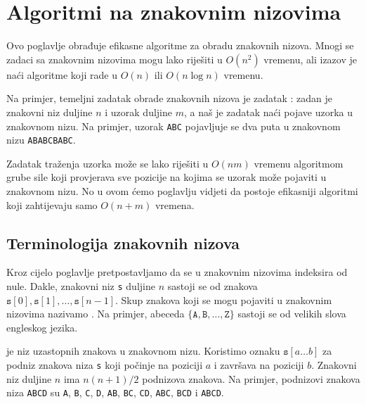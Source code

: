 \chapter{Algoritmi na znakovnim nizovima}

Ovo poglavlje obrađuje efikasne algoritme
za obradu znakovnih nizova.
Mnogi se zadaci sa znakovnim nizovima mogu lako riješiti
u $O(n^2)$ vremenu, ali izazov je
naći algoritme koji rade u $O(n)$ ili $O(n \log n)$
vremenu.


Na primjer, temeljni zadatak obrade znakovnih
nizova je zadatak :
zadan je znakovni niz duljine $n$ i uzorak duljine $m$,
a naš je zadatak naći pojave uzorka
u znakovnom nizu.
Na primjer, uzorak \texttt{ABC} pojavljuje se dva
puta u znakovnom nizu \texttt{ABABCBABC}.

Zadatak traženja uzorka može se lako riješiti
u $O(nm)$ vremenu algoritmom grube sile koji
provjerava sve pozicije na kojima se uzorak može
pojaviti u znakovnom nizu.
No u ovom ćemo poglavlju vidjeti da postoje
efikasniji algoritmi koji zahtijevaju samo
$O(n+m)$ vremena.


\section{Terminologija znakovnih nizova}


Kroz cijelo poglavlje pretpostavljamo da se
u znakovnim nizovima indeksira od nule.
Dakle, znakovni niz \texttt{s} duljine $n$
sastoji se od znakova
$\texttt{s}[0],\texttt{s}[1],\ldots,\texttt{s}[n-1]$.
Skup znakova koji se mogu pojaviti
u znakovnim nizovima nazivamo .
Na primjer, abeceda
$\{\texttt{A},\texttt{B},\ldots,\texttt{Z}\}$
sastoji se od velikih slova engleskog jezika.


 je niz uzastopnih
znakova u znakovnom nizu.
Koristimo oznaku $\texttt{s}[a \ldots b]$
za podniz znakova niza \texttt{s}
koji počinje na poziciji $a$ i završava na poziciji $b$.
Znakovni niz duljine $n$ ima $n(n+1)/2$ podnizova znakova.
Na primjer, podnizovi znakova niza
\texttt{ABCD} su
\texttt{A}, \texttt{B}, \texttt{C}, \texttt{D},
\texttt{AB}, \texttt{BC}, \texttt{CD},
\texttt{ABC}, \texttt{BCD} i \texttt{ABCD}.


